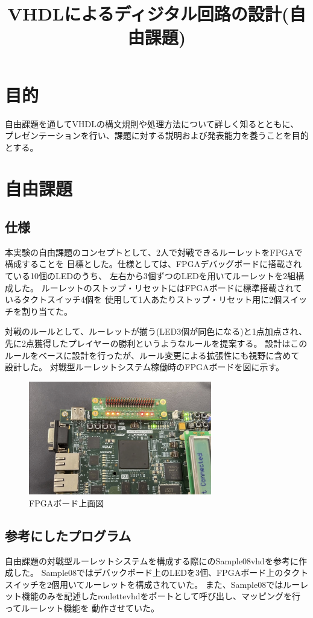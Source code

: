 \documentclass{ltjsarticle}
\title{VHDLによるディジタル回路の設計(自由課題)}
\begin{document}
\maketitle

\section{目的}
	自由課題を通してVHDLの構文規則や処理方法について詳しく知るとともに、
	プレゼンテーションを行い、課題に対する説明および発表能力を養うことを目的とする。
\section{自由課題}
	\subsection{仕様}
		本実験の自由課題のコンセプトとして、2人で対戦できるルーレットをFPGAで構成することを
		目標とした。仕様としては、FPGAデバッグボードに搭載されている10個のLEDのうち、
		左右から3個ずつのLEDを用いてルーレットを2組構成した。
		ルーレットのストップ・リセットにはFPGAボードに標準搭載されているタクトスイッチ4個を
		使用して1人あたりストップ・リセット用に2個スイッチを割り当てた。

		対戦のルールとして、ルーレットが揃う(LED3個が同色になる)と1点加点され、
		先に2点獲得したプレイヤーの勝利というようなルールを提案する。
		設計はこのルールをベースに設計を行ったが、ルール変更による拡張性にも視野に含めて
		設計した。
		対戦型ルーレットシステム稼働時のFPGAボードを図に示す。
		\begin{figure}[H]
		\centering
		\includegraphics[width = 8cm]{figs/IMG_4552.PNG}
		\caption{FPGAボード上面図}
		\label{fig:FPGA}
		\end{figure}
	\subsection{参考にしたプログラム}
		自由課題の対戦型ルーレットシステムを構成する際に\cite{ref:指導書}のSample08vhdを参考に作成した。
		Sample08ではデバックボード上のLEDを3個、FPGAボード上のタクトスイッチを2個用いてルーレットを構成されていた。
		また、Sample08ではルーレット機能のみを記述したroulettevhdをポートとして呼び出し、マッピングを行ってルーレット機能を
		動作させていた。
\end{document}
